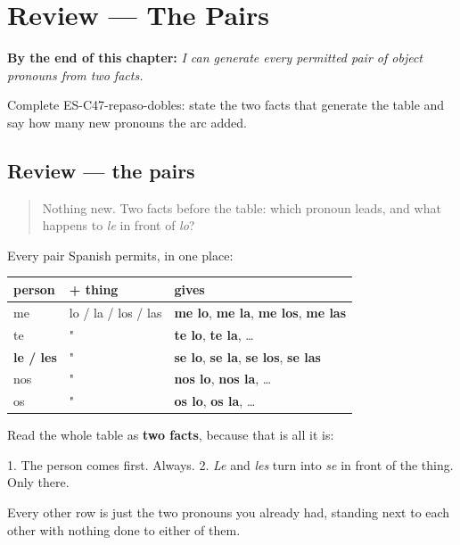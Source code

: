 
\chapter{Review --- The Pairs}
\label{ch:review-double-object}

\begin{chapteropening}
\textbf{By the end of this chapter:} \emph{I can generate every permitted pair of object pronouns from two facts.}

Complete ES-C47-repaso-dobles: state the two facts that generate the table and say how many new pronouns the arc added.
\end{chapteropening}

\section[Practice]{Review — the pairs}

\label{lesson:ES-C47-repaso-dobles}



\begin{quote}
Nothing new. Two facts before the table: which pronoun leads, and what happens to \emph{le} in front of \emph{lo}?
\end{quote}

\begin{grammarlens}[title={What you've built}]
Every pair Spanish permits, in one place:

\noindent
\begin{tabularx}{\linewidth}{@{}>{\raggedright\arraybackslash}X>{\raggedright\arraybackslash}X>{\raggedright\arraybackslash}X@{}}
\toprule
\textbf{person} & \textbf{+ thing} & \textbf{gives} \\
\midrule
me & lo / la / los / las & \textbf{me lo}, \textbf{me la}, \textbf{me los}, \textbf{me las} \\
te & " & \textbf{te lo}, \textbf{te la}, … \\
\textbf{le / les} & " & \textbf{se lo}, \textbf{se la}, \textbf{se los}, \textbf{se las} \\
nos & " & \textbf{nos lo}, \textbf{nos la}, … \\
os & " & \textbf{os lo}, \textbf{os la}, … \\
\bottomrule
\end{tabularx}

Read the whole table as \textbf{two facts}, because that is all it is:

1. The person comes first. Always. 2. \emph{Le} and \emph{les} turn into \emph{se} in front of the thing. Only there.

Every other row is just the two pronouns you already had, standing next to each other with nothing done to either of them.
\end{grammarlens}

